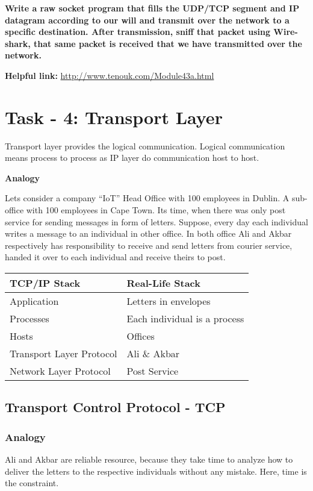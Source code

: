 \documentclass[letterpaper,10pt,english]{sphinxmanual}
\begin{document}
\textbf{Write a raw socket program that fills the UDP/TCP segment and IP datagram according to our will and transmit over the network to a specific destination. After transmission, sniff that packet using Wire-shark, that same packet is received that we have transmitted over the network.}

\textbf{Helpful link:} \href{http://www.tenouk.com/Module43a.html}{http://www.tenouk.com/Module43a.html}


\section{Task - 4: Transport Layer}
\label{week-06:task-4-transport-layer}
Transport layer provides the logical communication. Logical communication means process to process as IP layer do communication host to host.

\textbf{Analogy}

Lets consider a company “IoT” Head Office with 100 employees in Dublin. A sub-office with 100 employees in Cape Town. Its time, when there was only post service for sending messages in form of letters. Suppose, every day each individual writes a message to an individual in other office. In both office Ali and Akbar respectively has responsibility to receive and send letters from courier service, handed it over to each individual and receive theirs to post.

\begin{tabulary}{\linewidth}{|L|L|}
\hline
\textsf{\relax 
TCP/IP Stack
} & \textsf{\relax 
Real-Life Stack
}\\
\hline
Application
 & 
Letters in envelopes
\\
\hline
Processes
 & 
Each individual is a process
\\
\hline
Hosts
 & 
Offices
\\
\hline
Transport Layer Protocol
 & 
Ali \& Akbar
\\
\hline
Network Layer Protocol
 & 
Post Service
\\
\hline\end{tabulary}



\subsection{Transport Control Protocol - TCP}
\label{week-06:transport-control-protocol-tcp}

\subsubsection{Analogy}
\label{week-06:analogy}
Ali and Akbar are reliable resource, because they take time to analyze how to deliver the letters to the respective individuals without any mistake. Here, time is the constraint.
\end{document}
